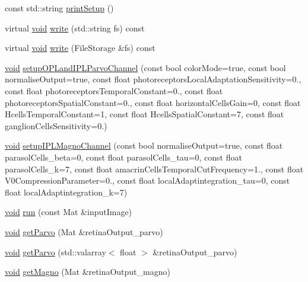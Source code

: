 \begin{DoxyCompactItemize}
const std\-::string \hyperlink{classcv_1_1Retina_ad4198c60334fd3bc03cbd26edb1a39e0}{print\-Setup} ()
\item 
virtual \hyperlink{legacy_8hpp_a8bb47f092d473522721002c86c13b94e}{void} \hyperlink{classcv_1_1Retina_afa7d08df652af10134689607a4ae1259}{write} (std\-::string fs) const 
\item 
virtual \hyperlink{legacy_8hpp_a8bb47f092d473522721002c86c13b94e}{void} \hyperlink{classcv_1_1Retina_a997451041a354c4d073743d8ffbaf26c}{write} (File\-Storage \&fs) const 
\item 
\hyperlink{legacy_8hpp_a8bb47f092d473522721002c86c13b94e}{void} \hyperlink{classcv_1_1Retina_aff944999a5e11eb93487e7bda7653077}{setup\-O\-P\-Land\-I\-P\-L\-Parvo\-Channel} (const bool color\-Mode=true, const bool normalise\-Output=true, const float photoreceptors\-Local\-Adaptation\-Sensitivity=0., const float photoreceptors\-Temporal\-Constant=0., const float photoreceptors\-Spatial\-Constant=0., const float horizontal\-Cells\-Gain=0, const float Hcells\-Temporal\-Constant=1, const float Hcells\-Spatial\-Constant=7, const float ganglion\-Cells\-Sensitivity=0.)
\item 
\hyperlink{legacy_8hpp_a8bb47f092d473522721002c86c13b94e}{void} \hyperlink{classcv_1_1Retina_a2c1c2e4ff63cce6e74aa4f66f821129b}{setup\-I\-P\-L\-Magno\-Channel} (const bool normalise\-Output=true, const float parasol\-Cells\-\_\-beta=0, const float parasol\-Cells\-\_\-tau=0, const float parasol\-Cells\-\_\-k=7, const float amacrin\-Cells\-Temporal\-Cut\-Frequency=1., const float V0\-Compression\-Parameter=0., const float local\-Adaptintegration\-\_\-tau=0, const float local\-Adaptintegration\-\_\-k=7)
\item 
\hyperlink{legacy_8hpp_a8bb47f092d473522721002c86c13b94e}{void} \hyperlink{classcv_1_1Retina_acae1d7d2d81bcab65ca4fac6e472ca73}{run} (const Mat \&input\-Image)
\item 
\hyperlink{legacy_8hpp_a8bb47f092d473522721002c86c13b94e}{void} \hyperlink{classcv_1_1Retina_a83c5acfb5d07ccdab0cca6ae11f50eae}{get\-Parvo} (Mat \&retina\-Output\-\_\-parvo)
\item 
\hyperlink{legacy_8hpp_a8bb47f092d473522721002c86c13b94e}{void} \hyperlink{classcv_1_1Retina_a834ba76a2b5fa191b43cf84b10c6ea99}{get\-Parvo} (std\-::valarray$<$ float $>$ \&retina\-Output\-\_\-parvo)
\item 
\hyperlink{legacy_8hpp_a8bb47f092d473522721002c86c13b94e}{void} \hyperlink{classcv_1_1Retina_a208c2c46c1e97cc13e938acf4dd06346}{get\-Magno} (Mat \&retina\-Output\-\_\-magno)

\end{DoxyCompactItemize}
